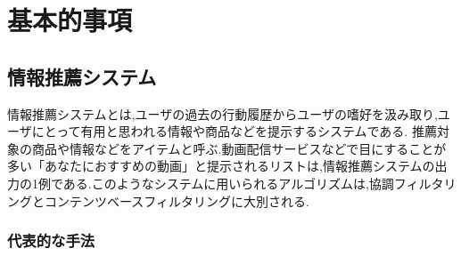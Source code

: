 \chapter{基本的事項}
\section{情報推薦システム}
情報推薦システムとは,ユーザの過去の行動履歴からユーザの嗜好を汲み取り,ユーザにとって有用と思われる情報や商品などを提示するシステムである.
推薦対象の商品や情報などをアイテムと呼ぶ.動画配信サービスなどで目にすることが多い「あなたにおすすめの動画」と提示されるリストは,情報推薦システムの出力の1例である.このようなシステムに用いられるアルゴリズムは,協調フィルタリング\cite{user-based-collaborative-filtering}\cite{item-based-collaborative-filtering}とコンテンツベースフィルタリング\cite{content-based-filtering}に大別される.
\subsection{代表的な手法}

